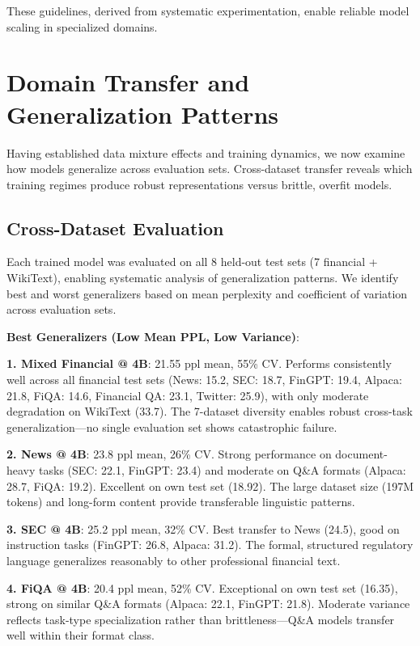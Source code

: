 These guidelines, derived from systematic experimentation, enable reliable model scaling in specialized domains.

\section{Domain Transfer and Generalization Patterns}

Having established data mixture effects and training dynamics, we now examine how models generalize across evaluation sets. Cross-dataset transfer reveals which training regimes produce robust representations versus brittle, overfit models.

\subsection{Cross-Dataset Evaluation}

Each trained model was evaluated on all 8 held-out test sets (7 financial + WikiText), enabling systematic analysis of generalization patterns. We identify best and worst generalizers based on mean perplexity and coefficient of variation across evaluation sets.

\textbf{Best Generalizers (Low Mean PPL, Low Variance)}:

\textbf{1. Mixed Financial @ 4B}: 21.55 ppl mean, 55\% CV. Performs consistently well across all financial test sets (News: 15.2, SEC: 18.7, FinGPT: 19.4, Alpaca: 21.8, FiQA: 14.6, Financial QA: 23.1, Twitter: 25.9), with only moderate degradation on WikiText (33.7). The 7-dataset diversity enables robust cross-task generalization—no single evaluation set shows catastrophic failure.

\textbf{2. News @ 4B}: 23.8 ppl mean, 26\% CV. Strong performance on document-heavy tasks (SEC: 22.1, FinGPT: 23.4) and moderate on Q\&A formats (Alpaca: 28.7, FiQA: 19.2). Excellent on own test set (18.92). The large dataset size (197M tokens) and long-form content provide transferable linguistic patterns.

\textbf{3. SEC @ 4B}: 25.2 ppl mean, 32\% CV. Best transfer to News (24.5), good on instruction tasks (FinGPT: 26.8, Alpaca: 31.2). The formal, structured regulatory language generalizes reasonably to other professional financial text.

\textbf{4. FiQA @ 4B}: 20.4 ppl mean, 52\% CV. Exceptional on own test set (16.35), strong on similar Q\&A formats (Alpaca: 22.1, FinGPT: 21.8). Moderate variance reflects task-type specialization rather than brittleness—Q\&A models transfer well within their format class.

